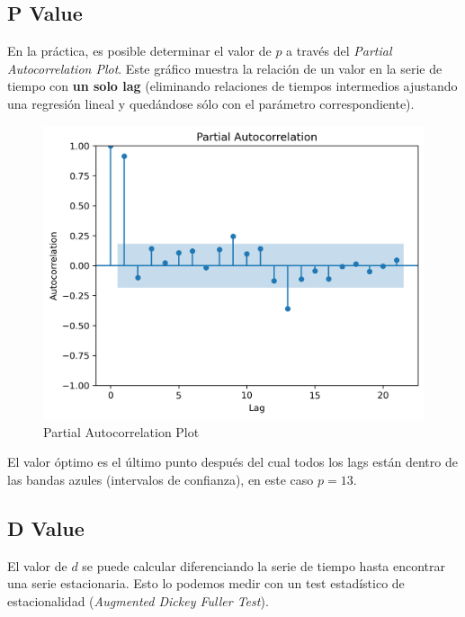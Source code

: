 \subsection{P Value}

En la práctica, es posible determinar el valor de $p$ a través del \textit{Partial Autocorrelation Plot}. Este gráfico muestra la relación de un valor en la serie de tiempo con \textbf{un solo lag} (eliminando relaciones de tiempos intermedios ajustando una regresión lineal y quedándose sólo con el parámetro correspondiente).
\begin{figure}[H]
    \center
    \includegraphics[scale=0.5]{notebooks/TS/img/partial_autocorrelation.png}
    \caption{Partial Autocorrelation Plot}
\end{figure}
El valor óptimo es el último punto después del cual todos los lags están dentro de las bandas azules (intervalos de confianza), en este caso $p=13$. 

\subsection{D Value}

El valor de $d$ se puede calcular diferenciando la serie de tiempo hasta encontrar una serie estacionaria. Esto lo podemos medir con un test estadístico de estacionalidad (\textit{Augmented Dickey Fuller Test}).

